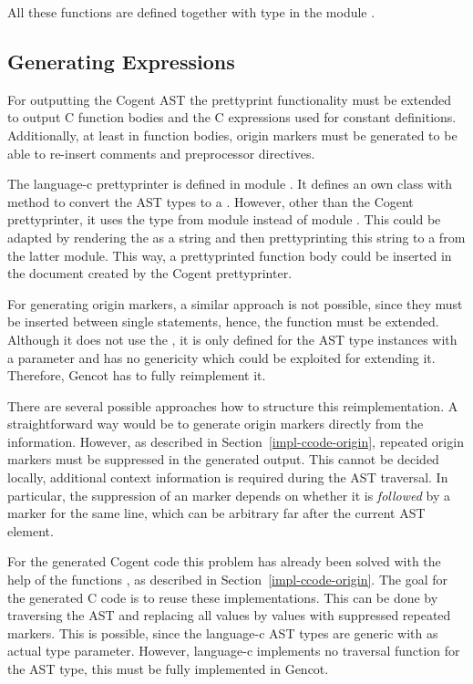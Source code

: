 All these functions are defined together with type  in the module .

\subsection{Generating Expressions}
\label{impl-ccode-expr}

For outputting the Cogent AST the prettyprint functionality must be extended to 
output C function bodies and the C expressions used for constant definitions. Additionally, at least in function bodies,
origin markers must be generated to be able to re-insert comments and preprocessor directives.

The language-c prettyprinter is defined in module . It defines an own class  with 
method  to convert the AST types to a . However, other than the Cogent prettyprinter, it uses 
the type  from module  instead of module .
This could be adapted by rendering the  as a string and then prettyprinting this string to a 
from the latter module. This way, a prettyprinted function body could be inserted in the document created by the
Cogent prettyprinter.

For generating origin markers, a similar approach is not possible, since they must be inserted between single statements,
hence, the function  must be extended. Although it does not use the , it is only defined for
the AST type instances with a  parameter and has no genericity which could be exploited for extending it.
Therefore, Gencot has to fully reimplement it. 

There are several possible approaches how to structure this reimplementation. A straightforward way would be to generate
origin markers directly from the  information. However, as described in Section~\ref{impl-ccode-origin},
repeated origin markers must be suppressed in the generated output. This cannot be decided locally, additional context
information is required during the AST traversal. In particular, the suppression of an  marker depends
on whether it is \textit{followed} by a marker for the same line, which can be arbitrary far after the current 
AST element.

For the generated Cogent code this problem has already been solved with the help of the functions , as described in Section~\ref{impl-ccode-origin}. The goal
for the generated C code is to reuse these implementations. This can be done by traversing the AST and replacing 
all  values by  values with suppressed repeated markers. This is possible, since the
language-c AST types are generic with  as actual type parameter. However, language-c implements 
no traversal function for the AST type, this must be fully implemented in Gencot.

